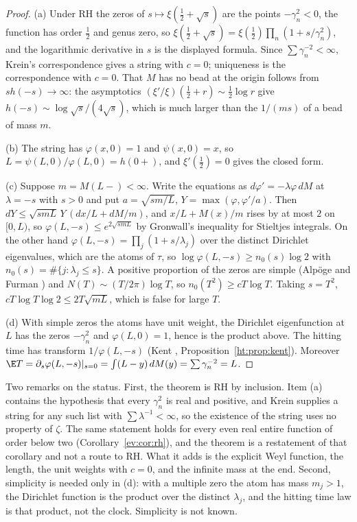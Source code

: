 \begin{proof}
(a) Under RH the zeros of $s\mapsto\xi(\frac12+\sqrt s)$ are the points $-\gamma_n^2<0$, the function has order $\frac12$ and genus zero, so $\xi(\frac12+\sqrt s)=\xi(\frac12)\prod_n(1+s/\gamma_n^2)$, and the logarithmic derivative in $s$ is the displayed formula. Since $\sum\gamma_n^{-2}<\infty$, Krein's correspondence gives a string with $c=0$; uniqueness is the correspondence with $c=0$. That $M$ has no bead at the origin follows from $sh(-s)\to\infty$: the asymptotics $(\xi'/\xi)(\frac12+r)\sim\frac12\log r$ give $h(-s)\sim\log\sqrt s/(4\sqrt s)$, which is much larger than the $1/(ms)$ of a bead of mass $m$.

(b) The string has $\varphi(x,0)=1$ and $\psi(x,0)=x$, so $L=\psi(L,0)/\varphi(L,0)=h(0+)$, and $\xi'(\frac12)=0$ gives the closed form.

(c) Suppose $m=M(L-)<\infty$. Write the equations as $d\varphi'=-\lambda\varphi\,dM$ at $\lambda=-s$ with $s>0$ and put $a=\sqrt{sm/L}$, $Y=\max(\varphi,\varphi'/a)$. Then $dY\le\sqrt{smL}\,Y\,(dx/L+dM/m)$, and $x/L+M(x)/m$ rises by at most $2$ on $[0,L)$, so $\varphi(L,-s)\le e^{2\sqrt{smL}}$ by Gronwall's inequality for Stieltjes integrals. On the other hand $\varphi(L,-s)=\prod_j(1+s/\lambda_j)$ over the distinct Dirichlet eigenvalues, which are the atoms of $\tau$, so $\log\varphi(L,-s)\ge n_0(s)\log2$ with $n_0(s)=\#\{j:\lambda_j\le s\}$. A positive proportion of the zeros are simple (Alp\"oge and Furman \cite{AF26}) and $N(T)\sim(T/2\pi)\log T$, so $n_0(T^2)\ge cT\log T$. Taking $s=T^2$, $cT\log T\log2\le2T\sqrt{mL}$, which is false for large $T$.

(d) With simple zeros the atoms have unit weight, the Dirichlet eigenfunction at $L$ has the zeros $-\gamma_n^2$ and $\varphi(L,0)=1$, hence is the product above. The hitting time has transform $1/\varphi(L,-s)$ (Kent \cite{Kent80}, Proposition~\ref{ht:prop:kent}). Moreover $\E T=\partial_s\varphi(L,-s)|_{s=0}=\int(L-y)\,dM(y)=\sum\gamma_n^{-2}=L$.
\end{proof}

Two remarks on the status. First, the theorem is RH by inclusion. Item (a) contains the hypothesis that every $\gamma_n^2$ is real and positive, and Krein supplies a string for any such list with $\sum\lambda^{-1}<\infty$, so the existence of the string uses no property of $\zeta$. The same statement holds for every even real entire function of order below two (Corollary~\ref{ev:cor:rh}), and the theorem is a restatement of that corollary and not a route to RH. What it adds is the explicit Weyl function, the length, the unit weights with $c=0$, and the infinite mass at the end. Second, simplicity is needed only in (d): with a multiple zero the atom has mass $m_j>1$, the Dirichlet function is the product over the distinct $\lambda_j$, and the hitting time law is that product, not the clock. Simplicity is not known.

